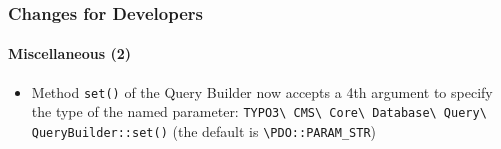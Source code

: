 \begin{frame}[fragile]
	\frametitle{Changes for Developers}
	\framesubtitle{Miscellaneous (2)}

	\begin{itemize}
		\item Method \texttt{set()} of the Query Builder now accepts a 4th argument
			to specify the type of the named parameter:\newline
			\small
				\texttt{TYPO3\textbackslash
					CMS\textbackslash
					Core\textbackslash
					Database\textbackslash
					Query\textbackslash
					QueryBuilder::set()}
			\normalsize\newline
			\vspace{0.2cm}
			(the default is \texttt{\textbackslash PDO::PARAM\_STR})

	\end{itemize}

\end{frame}

